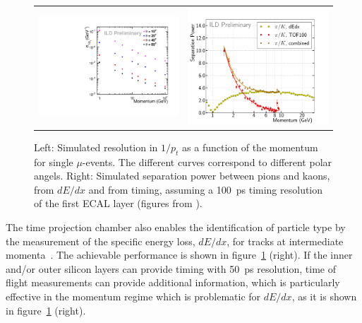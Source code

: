 \documentclass[%
 amsmath,amssymb,
 aps,
 longbibliography,
]{revtex4-1}
\begin{document}
\begin{figure}
    \centering
    \begin{tabular}{m{0.45\hsize}m{0.55\hsize}}
    \includegraphics[width=.9\hsize]{figures/PResolution_ILD_l5_v02.pdf} &
        \includegraphics[width=.82\hsize]{figures/Special_Combined_dEdx_TOF100.pdf}
    \end{tabular}
    \caption{ Left: Simulated resolution in $1/p_t$ as a function of the momentum for single $\mu$-events. The different curves correspond to different polar angels. Right: Simulated separation power between pions and kaons, from $dE/dx$ and from timing, assuming a 100~ps timing resolution of the first ECAL layer (figures from \cite{LCWS2018}).}
    \label{fig:momentumvsp}
\end{figure}

The time projection chamber also enables the identification of particle type by the measurement of the specific energy loss, $dE/dx$, for tracks at intermediate momenta~\cite{Hauschild:2000eg}. The achievable performance is shown in figure~\ref{fig:momentumvsp} (right). If the inner and/or outer silicon layers can provide timing with 50~ps resolution, time of flight measurements can provide additional information, which is particularly effective in the momentum regime which is problematic for $dE/dx$, as it is shown in figure~\ref{fig:momentumvsp} (right). 
\end{document}
